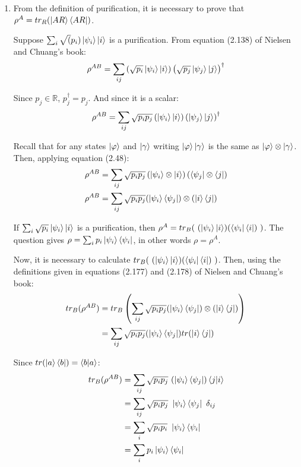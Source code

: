 \begin{enumerate}
\item From the definition of purification, it is necessary to prove that $\rho^A = tr_R(\ket{AR}\bra{AR})$.

Suppose $\sum_i \sqrt(p_i) \ket{\psi_i} \ket{i}$ is a purification. From equation (2.138) of Nielsen and Chuang's book:
\begin{align}
    \rho^{AB} = \sum_{ij} \left( \sqrt{p_i} \ket{\psi_i} \ket{i} \right) \left( \sqrt{p_j} \ket{\psi_j} \ket{j} \right) ^ \dagger
\end{align}

Since $p_j \in \mathbb{R}$, $p_j^\dagger = p_j$. And since it is a scalar:
\begin{align}
    \rho^{AB} = \sum_{ij} \sqrt{p_i p_j} \left( \ket{\psi_i} \ket{i} \right) \left( \ket{\psi_j} \ket{j} \right) ^ \dagger
\end{align}

Recall that for any states $\ket{\varphi}$ and $\ket{\gamma}$ writing $\ket{\varphi} \ket{\gamma}$ is the same as $\ket{\varphi} \otimes \ket{\gamma}$. Then, applying equation (2.48):
\begin{align}
    \rho^{AB} &= \sum_{ij} \sqrt{p_i p_j} \left( \ket{\psi_i} \otimes \ket{i} \right)
        \left( \bra{\psi_j} \otimes \bra{j} \right) \\
    \rho^{AB} &= \sum_{ij} \sqrt{p_i p_j} (\ket{\psi_i}\bra{\psi_j}) \otimes (\ket{i}\bra{j})
\end{align}

If $\sum_i \sqrt{p_i} \ket{\psi_i}\ket{i}$ is a purification, then
$\rho^A = tr_B(\ (\ket{\psi_i}\ket{i}) (\bra{\psi_i}\bra{i})\ )$.
The question gives $\rho = \sum_i p_i \ket{\psi_i}\bra{\psi_i}$, in other words $\rho = \rho^A$.

Now, it is necessary to calculate $tr_B(\ (\ket{\psi_i}\ket{i}) (\bra{\psi_i}\bra{i})\ )$. Then, using the definitions given in equations (2.177) and (2.178) of Nielsen and Chuang's book:
\begin{align}
    tr_B(\rho^{AB}) &= tr_B \left(\sum_{ij} \sqrt{p_i p_j} (\ket{\psi_i}\bra{\psi_j}) \otimes (\ket{i}\bra{j}) \right) \\
    &= \sum_{ij} \sqrt{p_i p_j} (\ket{\psi_i}\bra{\psi_j}) tr(\ket{i}\bra{j})
\end{align}

Since $tr(\ket{a}\bra{b}) = \braket{b|a}$:
\begin{align}
    tr_B(\rho^{AB}) &= \sum_{ij} \sqrt{p_i p_j}\ (\ket{\psi_i}\bra{\psi_j}) \braket{j|i} \\
    &= \sum_{ij} \sqrt{p_i p_j}\ \ket{\psi_i}\bra{\psi_j}\ \delta_{ij} \\
    &= \sum_i \sqrt{p_i p_i}\ \ket{\psi_i}\bra{\psi_i} \\
    &= \sum_i p_i\ket{\psi_i}\bra{\psi_i}
\end{align}


\end{enumerate}
